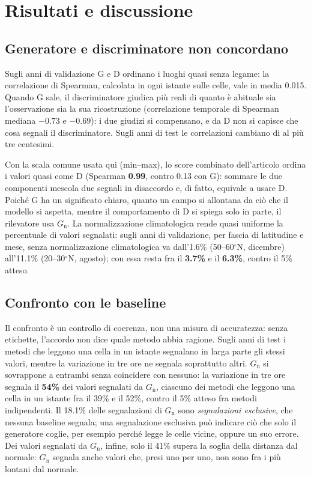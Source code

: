 \documentclass[11pt,a4paper]{article}
\begin{document}
\section{Risultati e discussione}

\subsection{Generatore e discriminatore non concordano}

Sugli anni di validazione G e D ordinano i luoghi quasi senza legame: la correlazione di Spearman, calcolata in ogni istante sulle celle, vale in media 0.015. Quando G sale, il discriminatore giudica più reali di quanto è abituale sia l'osservazione sia la sua ricostruzione (correlazione temporale di Spearman mediana $-0.73$ e $-0.69$): i due giudizi si compensano, e da D non si capisce che cosa segnali il discriminatore. Sugli anni di test le correlazioni cambiano di al più tre centesimi.

Con la scala comune usata qui (min--max), lo score combinato dell'articolo ordina i valori quasi come D (Spearman \textbf{0.99}, contro 0.13 con G): sommare le due componenti mescola due segnali in disaccordo e, di fatto, equivale a usare D. Poiché G ha un significato chiaro, quanto un campo si allontana da ciò che il modello si aspetta, mentre il comportamento di D si spiega solo in parte, il rilevatore usa $G_{\mathrm{n}}$. La normalizzazione climatologica rende quasi uniforme la percentuale di valori segnalati: sugli anni di validazione, per fascia di latitudine e mese, senza normalizzazione climatologica va dall'1.6\% (50--60$^\circ$N, dicembre) all'11.1\% (20--30$^\circ$N, agosto); con essa resta fra il \textbf{3.7\%} e il \textbf{6.3\%}, contro il 5\% atteso.

\subsection{Confronto con le baseline}

Il confronto è un controllo di coerenza, non una misura di accuratezza: senza etichette, l'accordo non dice quale metodo abbia ragione. Sugli anni di test i metodi che leggono una cella in un istante segnalano in larga parte gli stessi valori, mentre la variazione in tre ore ne segnala soprattutto altri. $G_{\mathrm{n}}$ si sovrappone a entrambi senza coincidere con nessuno: la variazione in tre ore segnala il \textbf{54\%} dei valori segnalati da $G_{\mathrm{n}}$, ciascuno dei metodi che leggono una cella in un istante fra il 39\% e il 52\%, contro il 5\% atteso fra metodi indipendenti. Il 18.1\% delle segnalazioni di $G_{\mathrm{n}}$ sono \emph{segnalazioni esclusive}, che nessuna baseline segnala; una segnalazione esclusiva può indicare ciò che solo il generatore coglie, per esempio perché legge le celle vicine, oppure un suo errore. Dei valori segnalati da $G_{\mathrm{n}}$, infine, solo il 41\% supera la soglia della distanza dal normale: $G_{\mathrm{n}}$ segnala anche valori che, presi uno per uno, non sono fra i più lontani dal normale.
\end{document}
